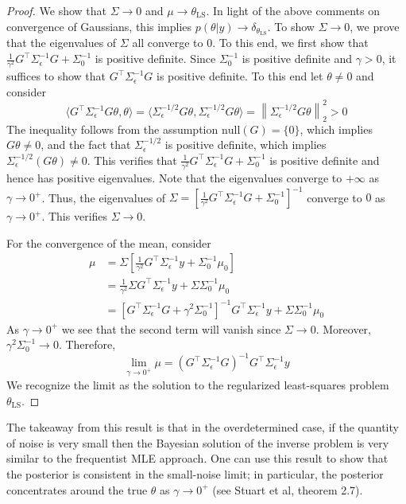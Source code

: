\documentclass[12pt]{article}
\newcommand*{\norm}[1]{\left\lVert#1\right\rVert}
\begin{document}
\begin{proof} 
We show that $\Sigma \to 0$ and $\mu \to \theta_{\text{LS}}$. In light of the above comments on convergence of Gaussians, this implies $p(\theta|y) \to \delta_{\theta_{\text{LS}}}$. 
To show $\Sigma \to 0$, we prove that the eigenvalues of $\Sigma$ all converge to $0$. To this end, we first show that $\frac{1}{\gamma^2} G^{\top} \Sigma_{\epsilon}^{-1} G + \Sigma_0^{-1}$
is positive definite. Since $\Sigma_0^{-1}$ is positive definite and $\gamma > 0$, it suffices to show that $G^{\top} \Sigma_{\epsilon}^{-1} G$ is positive definite. To this end let $\theta \neq 0$
and consider 
\[\langle G^{\top} \Sigma_{\epsilon}^{-1}G \theta, \theta \rangle = \langle \Sigma_{\epsilon}^{-1/2}G \theta, \Sigma_{\epsilon}^{-1/2}G \theta \rangle = \norm{\Sigma_{\epsilon}^{-1/2}G \theta}_2^2 > 0 \]
The inequality follows from the assumption $\text{null}(G) = \{0\}$, which implies $G\theta \neq 0$, and the fact that $\Sigma_{\epsilon}^{-1/2}$ is positive definite, which implies 
$\Sigma_{\epsilon}^{-1/2}\left(G\theta \right) \neq 0$. This verifies that $\frac{1}{\gamma^2} G^{\top} \Sigma_{\epsilon}^{-1} G + \Sigma_0^{-1}$ is positive definite and hence has positive 
eigenvalues. Note that the eigenvalues converge to $+\infty$ as $\gamma \to 0^+$. Thus, the eigenvalues of $\Sigma = \left[\frac{1}{\gamma^2} G^{\top} \Sigma_{\epsilon}^{-1} G + \Sigma_0^{-1}\right]^{-1}$
converge to $0$ as $\gamma \to 0^+$. This verifies $\Sigma \to 0$. 

For the convergence of the mean, consider 
\begin{align*}
\mu &= \Sigma \left[\frac{1}{\gamma^2} G^{\top} \Sigma_{\epsilon}^{-1} y + \Sigma_0^{-1} \mu_0 \right] \\
       &= \frac{1}{\gamma^2} \Sigma G^{\top} \Sigma_{\epsilon}^{-1}y + \Sigma \Sigma_0^{-1} \mu_0 \\
       &= \left[G^{\top} \Sigma_{\epsilon}^{-1} G + \gamma^2 \Sigma_0^{-1}\right]^{-1} G^{\top} \Sigma_{\epsilon}^{-1} y + \Sigma \Sigma_0^{-1} \mu_0 
\end{align*}
As $\gamma \to 0^+$ we see that the second term will vanish since $\Sigma \to 0$. Moreover, $\gamma^2 \Sigma_0^{-1} \to 0$. Therefore, 
\[\lim_{\gamma \to 0^+} \mu = \left(G^{\top} \Sigma_{\epsilon}^{-1} G \right)^{-1} G^{\top} \Sigma_{\epsilon}^{-1} y\]
We recognize the limit as the solution to the regularized least-squares problem $\theta_{\text{LS}}$. 
\end{proof}
The takeaway from this result is that in the overdetermined case, if the quantity of noise is very small then the Bayesian solution of the inverse problem is very similar to the 
frequentist MLE approach. One can use this result to show that the posterior is consistent in the small-noise limit; in particular, the posterior concentrates around the true
$\theta$ as $\gamma \to 0^+$ (see Stuart et al, theorem 2.7). 
\end{document}

